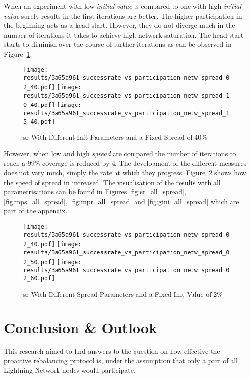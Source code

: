\documentclass[final]{fhnwreport}       %
\begin{document}
When an experiment with low \emph{initial value} is compared to one with high \emph{initial value} surely results in the first iterations are better. The higher participation in the beginning acts as a head-start. However, they do not diverge much in the number of iterations it takes to achieve high network saturation. The head-start starts to diminish over the course of further iterations as can be observed in Figure~\ref{fig:fix_spread}.

\begin{figure}[htp]
\centering
  \texttt{[image: results/3a65a961\_successrate\_vs\_participation\_netw\_spread\_02\_40.pdf]} 
  \texttt{[image: results/3a65a961\_successrate\_vs\_participation\_netw\_spread\_10\_40.pdf]} 
  \texttt{[image: results/3a65a961\_successrate\_vs\_participation\_netw\_spread\_15\_40.pdf]}
\caption{\gls{sr} With Different Init Parameters and a Fixed Spread of 40\%}
\label{fig:fix_spread}
\end{figure}

However, when low and high \emph{spread} are compared the number of iterations to reach a 99\% coverage is reduced by 4. The development of the different measures does not vary much, simply the rate at which they progress. Figure~\ref{fig:fix_init} shows how the speed of spread in increased. The visualisation of the results with all parametrisations can be found in Figures \ref{fig:sr_all_spread}, \ref{fig:mps_all_spread}, \ref{fig:mpr_all_spread} and \ref{fig:gini_all_spread} which are part of the appendix.


\newpage
\begin{figure}[htp]
\centering
  \texttt{[image: results/3a65a961\_successrate\_vs\_participation\_netw\_spread\_02\_40.pdf]} 
  \texttt{[image: results/3a65a961\_successrate\_vs\_participation\_netw\_spread\_02\_50.pdf]} 
  \texttt{[image: results/3a65a961\_successrate\_vs\_participation\_netw\_spread\_02\_60.pdf]}
\caption{\gls{sr} With Different Spread Parameters and a Fixed Init Value of 2\%}
\label{fig:fix_init}
\end{figure}

\newpage
\section{Conclusion \& Outlook}\label{sec:concl}
This research aimed to find answers to the question on how effective the proactive rebalancing protocol is, under the assumption that only a part of all Lightning Network nodes would participate. 
\end{document}
